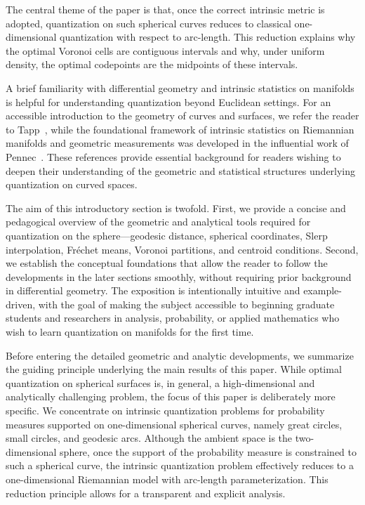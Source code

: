 \documentclass[12pt, reqno]{amsart}
\theoremstyle{plain}
\theoremstyle{definition}
\begin{document}
The central theme of the paper is that, once the correct intrinsic metric is adopted,
quantization on such spherical curves reduces to classical one-dimensional quantization
with respect to arc-length. This reduction explains why the optimal Voronoi cells are
contiguous intervals and why, under uniform density, the optimal codepoints are the
midpoints of these intervals.

A brief familiarity with differential geometry and intrinsic statistics on manifolds is helpful for
understanding quantization beyond Euclidean settings. For an accessible introduction to the geometry of
curves and surfaces, we refer the reader to Tapp~\cite{Tapp}, while the foundational framework of intrinsic
statistics on Riemannian manifolds and geometric measurements was developed in the influential work of
Pennec~\cite{Pennec2006}. These references provide essential background for readers wishing to deepen
their understanding of the geometric and statistical structures underlying quantization on curved spaces.

The aim of this introductory section is twofold. First, we provide a concise and pedagogical overview of
the geometric and analytical tools required for quantization on the sphere—geodesic distance, spherical
coordinates, Slerp interpolation, Fréchet means, Voronoi partitions, and centroid conditions. Second,
we establish the conceptual foundations that allow the reader to follow the developments in the later
sections smoothly, without requiring prior background in differential geometry. The exposition is
intentionally intuitive and example-driven, with the goal of making the subject accessible to beginning
graduate students and researchers in analysis, probability, or applied mathematics who wish to learn
quantization on manifolds for the first time.


Before entering the detailed geometric and analytic developments, we summarize
the guiding principle underlying the main results of this paper. While optimal
quantization on spherical surfaces is, in general, a high-dimensional and
analytically challenging problem, the focus of this paper is deliberately more
specific. We concentrate on intrinsic quantization problems for probability measures
supported on one-dimensional spherical curves, namely great circles, small circles,
and geodesic arcs. Although the ambient space is the two-dimensional sphere, once
the support of the probability measure is constrained to such a spherical curve,
the intrinsic quantization problem effectively reduces to a one-dimensional
Riemannian model with arc-length parameterization. This reduction principle allows
for a transparent and explicit analysis.
\end{document}
